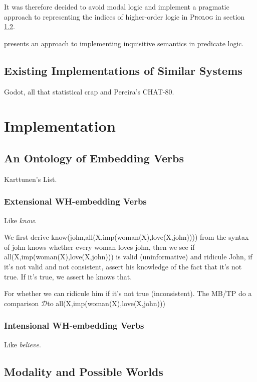 \documentclass{scrartcl}
\newcommand{\pn}{\textsc}
\newcommand{\prol}{\pn{Prolog} }
\begin{document}
It was therefore decided to avoid modal logic and implement a pragmatic approach
to representing the indices of higher-order logic in \prol in section
\ref{sec:indices}.

\cite{g:inqs} presents an approach to implementing inquisitive semantics in
predicate logic.

\subsection{Existing Implementations of Similar Systems}\label{sec:othercrap}

Godot, all that statistical crap and Pereira's CHAT-80.

\section{Implementation}

\subsection{An Ontology of Embedding Verbs}

Karttunen's List.

\subsubsection{Extensional WH-embedding Verbs}

Like \emph{know}.

We first derive know(john,all(X,imp(woman(X),love(X,john)))) from the syntax of
john knows whether every woman loves john, then we see if
all(X,imp(woman(X),love(X,john))) is valid (uninformative) and ridicule John, if
it's not valid and not consistent, assert his knowledge of the fact that it's
not true. If it's true, we assert he knows that.

For whether we can ridicule him if it's not true (inconsistent).
\newcommand{\discourse}{\ensuremath{\mathcal{D}}}
The MB/TP do a comparison \discourse to all(X,imp(woman(X),love(X,john)))

\subsubsection{Intensional WH-embedding Verbs}

Like \emph{believe}.

\subsection{Modality and Possible Worlds}
\label{sec:indices}
\end{document}

